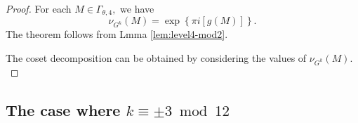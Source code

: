 \documentclass[12pt]{article}
\theoremstyle{definition}
\numberwithin{equation}{section}
\numberwithin{theorem}{section}
\begin{document}
\begin{proof}
For each $M\in\Gamma_{\theta,4},$ 
we have 
\begin{equation*}
\nu_{G^k}(M)=
\exp
\left\{
\pi i
\left[
g(M)
\right]
\right\}. 
\end{equation*}
The theorem follows from Lmma \ref{lem:level4-mod2}.  
\par
The coset decomposition can be obtained by considering the values of $\nu_{G^{k}  }(M).$
\end{proof}























\subsection{The case where $k\equiv \pm 3 \bmod{12}$}
\end{document}
